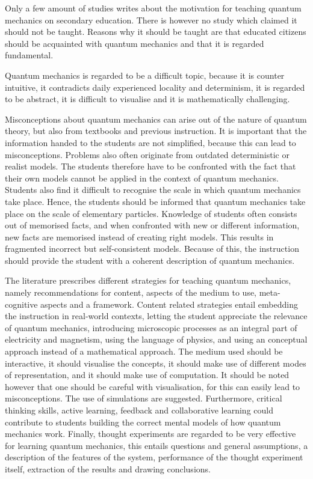 \documentclass[11pt,twoside]{report} %
\begin{document}
Only a few amount of studies writes about the motivation for teaching quantum mechanics on secondary education. There is however no study which claimed it should not be taught. Reasons why it should be taught are that educated citizens should be acquainted with quantum mechanics and that it is regarded fundamental.

Quantum mechanics is regarded to be a difficult topic, because it is counter intuitive, it contradicts daily experienced locality and determinism, it is regarded to be abstract, it is difficult to visualise and it is mathematically challenging.

Misconceptions about quantum mechanics can arise out of the nature of quantum theory, but also from textbooks and previous instruction. It is important that the information handed to the students are not simplified, because this can lead to misconceptions. Problems also often originate from outdated deterministic or realist models. The students therefore have to be confronted with the fact that their own models cannot be applied in the context of quantum mechanics. Students also find it difficult to recognise the scale in which quantum mechanics take place. Hence, the students should be informed that quantum mechanics take place on the scale of elementary particles. Knowledge of students often consists out of memorised facts, and when confronted with new or different information, new facts are memorised instead of creating right models. This results in fragmented incorrect but self-consistent models. Because of this, the instruction should provide the student with a coherent description of quantum mechanics.

The literature prescribes different strategies for teaching quantum mechanics, namely recommendations for content, aspects of the medium to use, meta-cognitive aspects and a framework. Content related strategies entail embedding the instruction in real-world contexts, letting the student appreciate the relevance of quantum mechanics, introducing microscopic processes as an integral part of electricity and magnetism, using the language of physics, and using an conceptual approach instead of a mathematical approach. The medium used should be interactive, it should visualise the concepts, it should make use of different modes of representation, and it should make use of computation. It should be noted however that one should be careful with visualisation, for this can easily lead to misconceptions. The use of simulations are suggested. Furthermore, critical thinking skills, active learning, feedback and collaborative learning could contribute to students building the correct mental models of how quantum mechanics work. Finally, thought experiments are regarded to be very effective for learning quantum mechanics, this entails questions and general assumptions, a description of the features of the system, performance of the thought experiment itself, extraction of the results and drawing conclusions.
\end{document}
